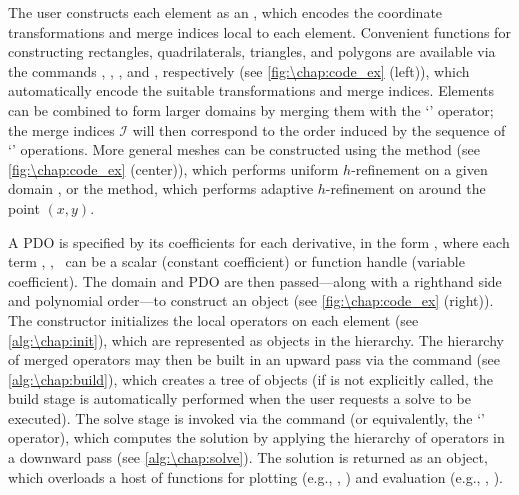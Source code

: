 The user constructs each element as an , which encodes the coordinate transformations and merge indices local to each element. Convenient functions for constructing rectangles, quadrilaterals, triangles, and polygons are available via the commands , , , and , respectively (see \cref{fig:\chap:code_ex} (left)), which automatically encode the suitable transformations and merge indices. Elements can be combined to form larger domains by merging them with the `\mytt{\&}' operator; the merge indices $\mathcal{I}$ will then correspond to the order induced by the sequence of `\mytt{\&}' operations. More general meshes can be constructed using the  method (see \cref{fig:\chap:code_ex} (center)), which performs uniform $h$-refinement on a given domain , or the  method, which performs adaptive $h$-refinement on  around the point $(x,y)$.

A PDO is specified by its coefficients for each derivative, in the form , where each term , , \textellipsis\ can be a scalar (constant coefficient) or function handle (variable coefficient). The domain and PDO are then passed---along with a righthand side and polynomial order---to construct an  object (see \cref{fig:\chap:code_ex} (right)). The  constructor initializes the local operators on each element (see \cref{alg:\chap:init}), which are represented as  objects in the hierarchy. The hierarchy of merged operators may then be built in an upward pass via the  command (see \cref{alg:\chap:build}), which creates a tree of  objects (if  is not explicitly called, the build stage is automatically performed when the user requests a solve to be executed). The solve stage is invoked via the  command (or equivalently, the `' operator), which computes the solution by applying the hierarchy of operators in a downward pass (see \cref{alg:\chap:solve}). The solution is returned as an  object, which overloads a host of functions for plotting (e.g., , ) and evaluation (e.g., , ).

